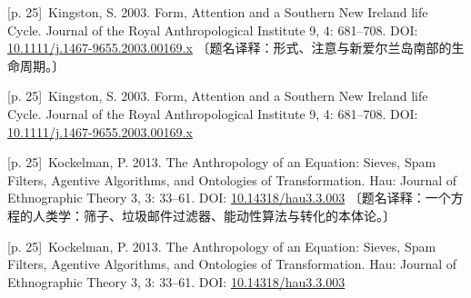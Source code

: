 \documentclass[10pt,a4paper]{article}
\begin{document}
\noindent\begin{minipage}{\textwidth}\begin{minipage}[t]{\dimexpr.5\textwidth-4mm\relax}\noindent\begin{minipage}[t]{\linewidth}{\scriptsize\color{gray} [p. 25]}\ Kingston, S. 2003. Form, Attention and a Southern New Ireland life Cycle. Journal of the Royal Anthropological Institute 9, 4: 681–708. DOI: \url{10.1111/j.1467-9655.2003.00169.x} 〔题名译释：形式、注意与新爱尔兰岛南部的生命周期。〕\par\end{minipage}\par\end{minipage}\hfill\begin{minipage}[t]{\dimexpr.5\textwidth-4mm\relax}\noindent\begin{minipage}[t]{\linewidth}{\scriptsize\color{gray} [p. 25]}\ Kingston, S. 2003. Form, Attention and a Southern New Ireland life Cycle. Journal of the Royal Anthropological Institute 9, 4: 681–708. DOI: \url{10.1111/j.1467-9655.2003.00169.x}\par\end{minipage}\par\end{minipage}\end{minipage}\par
\noindent\begin{minipage}{\textwidth}\begin{minipage}[t]{\dimexpr.5\textwidth-4mm\relax}\noindent\begin{minipage}[t]{\linewidth}{\scriptsize\color{gray} [p. 25]}\ Kockelman, P. 2013. The Anthropology of an Equation: Sieves, Spam Filters, Agentive Algorithms, and Ontologies of Transformation. Hau: Journal of Ethnographic Theory 3, 3: 33–61. DOI: \url{10.14318/hau3.3.003} 〔题名译释：一个方程的人类学：筛子、垃圾邮件过滤器、能动性算法与转化的本体论。〕\par\end{minipage}\par\end{minipage}\hfill\begin{minipage}[t]{\dimexpr.5\textwidth-4mm\relax}\noindent\begin{minipage}[t]{\linewidth}{\scriptsize\color{gray} [p. 25]}\ Kockelman, P. 2013. The Anthropology of an Equation: Sieves, Spam Filters, Agentive Algorithms, and Ontologies of Transformation. Hau: Journal of Ethnographic Theory 3, 3: 33–61. DOI: \url{10.14318/hau3.3.003}\par\end{minipage}\par\end{minipage}\end{minipage}\par
\end{document}
